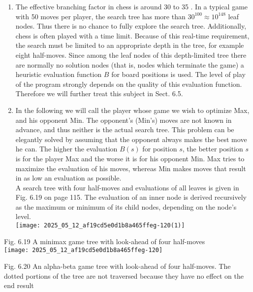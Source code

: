 \documentclass[10pt]{article}
\begin{document}
\begin{enumerate}
  \item The effective branching factor in chess is around 30 to 35 . In a typical game with 50 moves per player, the search tree has more than $30^{100} \approx 10^{148}$ leaf nodes. Thus there is no chance to fully explore the search tree. Additionally, chess is often played with a time limit. Because of this real-time requirement, the search must be limited to an appropriate depth in the tree, for example eight half-moves. Since among the leaf nodes of this depth-limited tree there are normally no solution nodes (that is, nodes which terminate the game) a heuristic evaluation function $B$ for board positions is used. The level of play of the program strongly depends on the quality of this evaluation function. Therefore we will further treat this subject in Sect. 6.5.
  \item In the following we will call the player whose game we wish to optimize Max, and his opponent Min. The opponent's (Min's) moves are not known in advance, and thus neither is the actual search tree. This problem can be elegantly solved by assuming that the opponent always makes the best move he can. The higher the evaluation $B(s)$ for position $s$, the better position $s$ is for the player Max and the worse it is for his opponent Min. Max tries to maximize the evaluation of his moves, whereas Min makes moves that result in as low an evaluation as possible.\\
A search tree with four half-moves and evaluations of all leaves is given in Fig. 6.19 on page 115. The evaluation of an inner node is derived recursively as the maximum or minimum of its child nodes, depending on the node's level.\\
\texttt{[image: 2025\_05\_12\_af19cd5e0d1b8a465ffeg-120(1)]}
\end{enumerate}

Fig. 6.19 A minimax game tree with look-ahead of four half-moves\\
\texttt{[image: 2025\_05\_12\_af19cd5e0d1b8a465ffeg-120]}

Fig. 6.20 An alpha-beta game tree with look-ahead of four half-moves. The dotted portions of the tree are not traversed because they have no effect on the end result
\end{document}
